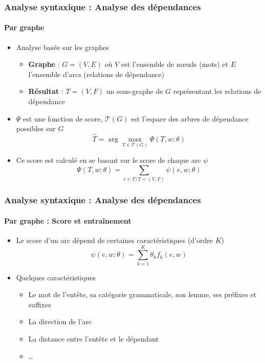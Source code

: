 \documentclass[xcolor=table]{beamer}
\begin{document}
\begin{frame}
\frametitle{Analyse syntaxique : Analyse des dépendances}
\framesubtitle{Par graphe}

\begin{minipage}{.6\textwidth}
	\begin{itemize}
		\item Analyse basée sur les graphes
		\begin{itemize}
			\item \textbf{Graphe} : $G = (V, E)$ où $V$ est l'ensemble de nœuds (mots) et $E$ l'ensemble d'arcs (relations de dépendance)
			\item \textbf{Résultat} : $T = (V, F)$ un sous-graphe de $G$ représentant les relations de dépendance
		\end{itemize}
	\end{itemize}
\end{minipage}
\begin{minipage}{.38\textwidth}
\end{minipage}

\begin{itemize}
	\item $\Psi$ est une fonction de score, $ \mathcal{T}(G) $ est l'espace des arbres de dépendance possibles sur $G$
	\[ \hat{T} = \arg\max\limits_{T \in \mathcal{T}(G)} \Psi(T, w; \theta) \]
	\item Ce score est calculé en se basant sur le score de chaque arc $\psi$
	\[ \Psi(T, w; \theta) = \sum_{e \in F / T = (V, F)} \psi(e, w; \theta) \]
\end{itemize}

\end{frame}

\begin{frame}
\frametitle{Analyse syntaxique : Analyse des dépendances}
\framesubtitle{Par graphe : Score et entraînement}

\begin{itemize}
	\item Le score d'un arc dépend de certaines caractéristiques (d'ordre $K$)
	\[ \psi(e, w; \theta) = \sum_{k = 1}^{K} \theta_k f_k(e, w)  \]
	
	\item Quelques caractéristiques 
	\begin{itemize}
		\item Le mot de l'entête, sa catégorie grammaticale, son lemme, ses préfixes et suffixes
		\item La direction de l'arc
		\item La distance entre l'entête et le dépendant
		\item \ldots
	\end{itemize}
	
\end{itemize}

\end{frame}
\end{document}
